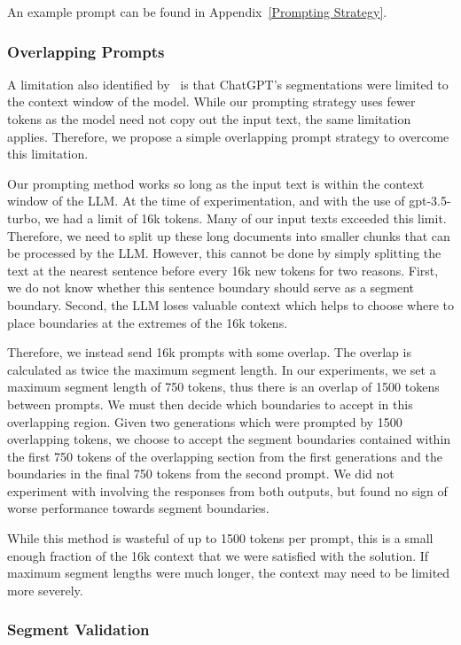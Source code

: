An example prompt can be found in Appendix~\ref{Prompting Strategy}.

\subsubsection{Overlapping Prompts}

A limitation also identified by~\cite{XingThesis} is that ChatGPT's segmentations were limited to the context window of the model. While our prompting strategy uses fewer tokens as the model need not copy out the input text, the same limitation applies. Therefore, we propose a simple overlapping prompt strategy to overcome this limitation.

Our prompting method works so long as the input text is within the context window of the LLM. At the time of experimentation, and with the use of gpt-3.5-turbo, we had a limit of 16k tokens. Many of our input texts exceeded this limit. Therefore, we need to split up these long documents into smaller chunks that can be processed by the LLM. However, this cannot be done by simply splitting the text at the nearest sentence before every 16k new tokens for two reasons. First, we do not know whether this sentence boundary should serve as a segment boundary. Second, the LLM loses valuable context which helps to choose where to place boundaries at the extremes of the 16k tokens.

Therefore, we instead send 16k prompts with some overlap. The overlap is calculated as twice the maximum segment length. In our experiments, we set a maximum segment length of 750 tokens, thus there is an overlap of 1500 tokens between prompts. We must then decide which boundaries to accept in this overlapping region. Given two generations which were prompted by 1500 overlapping tokens, we choose to accept the segment boundaries contained within the first 750 tokens of the overlapping section from the first generations and the boundaries in the final 750 tokens from the second prompt. We did not experiment with involving the responses from both outputs, but found no sign of worse performance towards segment boundaries.

While this method is wasteful of up to 1500 tokens per prompt, this is a small enough fraction of the 16k context that we were satisfied with the solution. If maximum segment lengths were much longer, the context may need to be limited more severely.

\subsubsection{Segment Validation}

